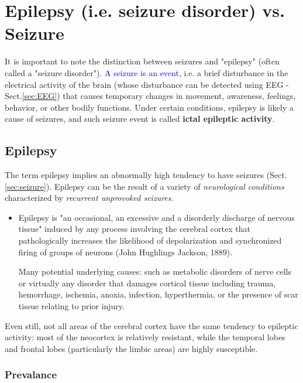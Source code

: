 \chapter{Epilepsy (i.e. seizure disorder) vs. Seizure}
\label{sec:epilepsy_seizure_detection}

It is important to note the distinction between seizures and "epilepsy" (often
called a "seizure disorder"). \textcolor{blue}{A seizure is an event}, i.e. a
brief disturbance in the electrical activity of the brain (whose disturbance can
be detected using EEG - Sect.\ref{sec:EEG}) that causes temporary changes in
movement, awareness, feelings, behavior, or other bodily functions. Under
certain conditions, epilepsy is likely a cause of seizures, and such seizure
event is called {\bf ictal epileptic activity}.

\section{Epilepsy}
\label{sec:epilepsy}

The term epilepsy implies an abnormally high tendency to have seizures
(Sect.\ref{sec:seizure}). Epilepsy can be the result of a variety of {\it
neurological conditions} characterized by {\it recurrent unprovoked seizures}.

\begin{itemize}
  
  \item  Epilepsy is "an occasional, an excessive and a disorderly discharge of
  nervous tissue" induced by any process involving the cerebral cortex that
  pathologically increases the likelihood of depolarization and synchronized
  firing of groups of neurons (John Hughlings Jackson, 1889).
  
Many potential underlying causes: such as metabolic disorders of nerve cells or
virtually any disorder that damages cortical tissue including trauma,
  hemorrhage, ischemia, anoxia, infection, hyperthermia, or the presence of scar
  tissue relating to prior injury.
  
  
\end{itemize}



Even still, not all areas of the cerebral cortex have the same tendency to
epileptic activity: most of the neocortex is relatively resistant, while the temporal lobes and frontal lobes (particularly the limbic areas) are highly susceptible.


\subsection{Prevalance} 

